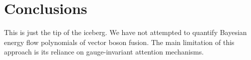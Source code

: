 \section{Conclusions}\label{sec:conclusions}

This is just the tip of the iceberg. We have not attempted to quantify
Bayesian energy flow polynomials of vector boson fusion. The main
limitation of this approach is its reliance on gauge-invariant attention
mechanisms.

